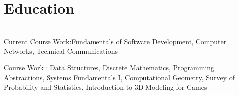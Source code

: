 \section{Education}

\\

\hspace{0.1 in} \underline{{Current Course Work}}:Fundamentals of Software Development, Computer Networks, Technical Communications

\hspace{0.1 in} \underline{{Course Work}} :  Data Structures, Discrete Mathematics, Programming Abstractions, Systems Fundamentals I, Computational Geometry, Survey of Probability and Statistics, Introduction to 3D Modeling for Games
\sectionsep